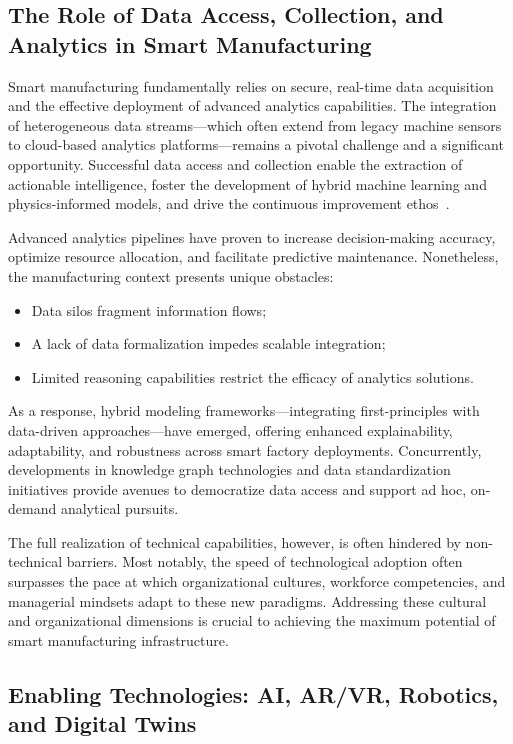\documentclass[sigconf]{acmart}
\begin{document}
\subsection{The Role of Data Access, Collection, and Analytics in Smart Manufacturing}

Smart manufacturing fundamentally relies on secure, real-time data acquisition and the effective deployment of advanced analytics capabilities. The integration of heterogeneous data streams—which often extend from legacy machine sensors to cloud-based analytics platforms—remains a pivotal challenge and a significant opportunity. Successful data access and collection enable the extraction of actionable intelligence, foster the development of hybrid machine learning and physics-informed models, and drive the continuous improvement ethos~\cite{ref21}.

Advanced analytics pipelines have proven to increase decision-making accuracy, optimize resource allocation, and facilitate predictive maintenance. Nonetheless, the manufacturing context presents unique obstacles:
\begin{itemize}
    \item Data silos fragment information flows;
    \item A lack of data formalization impedes scalable integration;
    \item Limited reasoning capabilities restrict the efficacy of analytics solutions.
\end{itemize}
As a response, hybrid modeling frameworks—integrating first-principles with data-driven approaches—have emerged, offering enhanced explainability, adaptability, and robustness across smart factory deployments. Concurrently, developments in knowledge graph technologies and data standardization initiatives provide avenues to democratize data access and support ad hoc, on-demand analytical pursuits.

The full realization of technical capabilities, however, is often hindered by non-technical barriers. Most notably, the speed of technological adoption often surpasses the pace at which organizational cultures, workforce competencies, and managerial mindsets adapt to these new paradigms. Addressing these cultural and organizational dimensions is crucial to achieving the maximum potential of smart manufacturing infrastructure.

\subsection{Enabling Technologies: AI, AR/VR, Robotics, and Digital Twins}
\end{document}

